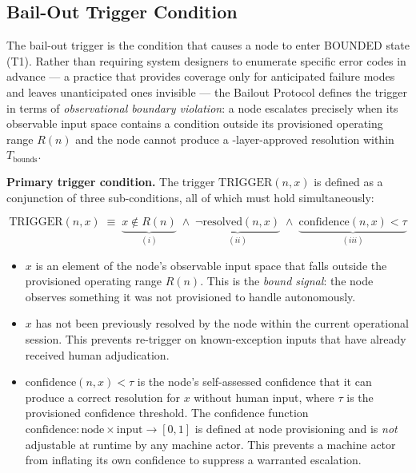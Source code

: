 \subsection{Bail-Out Trigger Condition}\label{sec:bailout-trigger}

The bail-out trigger is the condition that causes a node to enter BOUNDED state (T1). Rather than requiring system designers to enumerate specific error codes in advance — a practice that provides coverage only for anticipated failure modes and leaves unanticipated ones invisible — the Bailout Protocol defines the trigger in terms of \emph{observational boundary violation}: a node escalates precisely when its observable input space contains a condition outside its provisioned operating range $R(n)$ and the node cannot produce a \fact-layer-approved resolution within $T_{\text{bounds}}$.

\bigskip
\noindent\textbf{Primary trigger condition.} The trigger $\text{TRIGGER}(n, x)$ is defined as a conjunction of three sub-conditions, all of which must hold simultaneously:

\begin{equation}
\text{TRIGGER}(n, x) \;\equiv\; \underbrace{x \notin R(n)}_{(i)} \;\land\; \underbrace{\neg\text{resolved}(n, x)}_{(ii)} \;\land\; \underbrace{\text{confidence}(n, x) < \tau}_{(iii)} \tag{TC}
\end{equation}

\begin{itemize}\itemsep=0pt
\item[(i)] $x$ is an element of the node's observable input space that falls outside the provisioned operating range $R(n)$. This is the \emph{bound signal}: the node observes something it was not provisioned to handle autonomously.
\item[(ii)] $x$ has not been previously resolved by the node within the current operational session. This prevents re-trigger on known-exception inputs that have already received human adjudication.
\item[(iii)] $\text{confidence}(n, x) < \tau$ is the node's self-assessed confidence that it can produce a correct resolution for $x$ without human input, where $\tau$ is the provisioned confidence threshold. The confidence function $\text{confidence} : \text{node} \times \text{input} \rightarrow [0, 1]$ is defined at node provisioning and is \emph{not} adjustable at runtime by any machine actor. This prevents a machine actor from inflating its own confidence to suppress a warranted escalation.
\end{itemize}

